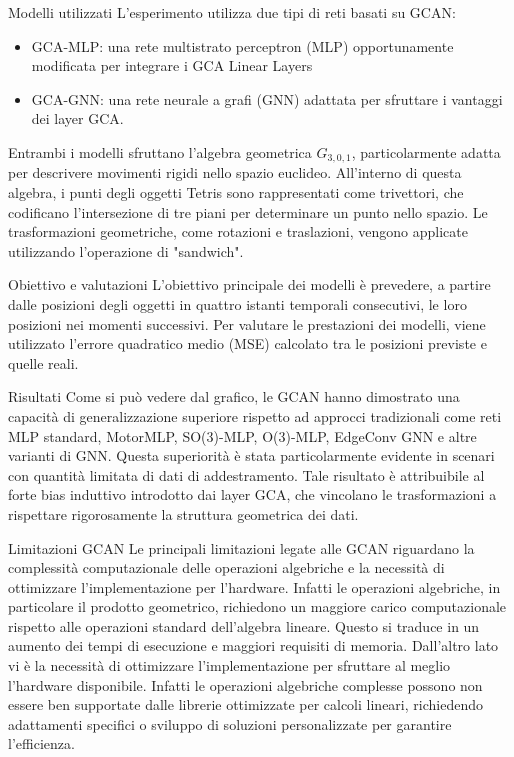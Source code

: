 \begin{frame}{Modelli utilizzati}
   L'esperimento utilizza due tipi di reti basati su GCAN:
   \begin{itemize}
      \item GCA-MLP: una rete multistrato perceptron (MLP) opportunamente modificata per integrare i GCA Linear Layers
      \item GCA-GNN: una rete neurale a grafi (GNN) adattata per sfruttare i vantaggi dei layer GCA.
   \end{itemize}
   Entrambi i modelli sfruttano l’algebra geometrica \(G_{3,0,1}\), particolarmente adatta per descrivere movimenti rigidi nello spazio euclideo. 
   All’interno di questa algebra, i punti degli oggetti Tetris sono rappresentati come trivettori, che codificano l’intersezione di tre piani per determinare un punto nello spazio.
   Le trasformazioni geometriche, come rotazioni e traslazioni, vengono applicate utilizzando l’operazione di "sandwich".
\end{frame}

\begin{frame}{Obiettivo e valutazioni}
   L’obiettivo principale dei modelli è prevedere, a partire dalle posizioni degli oggetti in quattro istanti temporali consecutivi, le loro posizioni nei momenti successivi. 
   Per valutare le prestazioni dei modelli, viene utilizzato l’errore quadratico medio (MSE) calcolato tra le posizioni previste e quelle reali.
\end{frame}

\begin{frame}{Risultati}
   Come si può vedere dal grafico, le GCAN hanno dimostrato una capacità di generalizzazione superiore rispetto ad approcci tradizionali come reti MLP standard, MotorMLP, SO(3)-MLP, O(3)-MLP, EdgeConv GNN e altre varianti di GNN. 
   Questa superiorità è stata particolarmente evidente in scenari con quantità limitata di dati di addestramento. Tale risultato è attribuibile al forte bias induttivo introdotto dai layer GCA, che vincolano le trasformazioni a rispettare rigorosamente la struttura geometrica dei dati.
\end{frame}

\begin{frame}{Limitazioni GCAN}
   Le principali limitazioni legate alle GCAN riguardano la complessità computazionale delle operazioni algebriche e la necessità di ottimizzare l’implementazione per l’hardware. Infatti le operazioni algebriche, in particolare il prodotto geometrico, richiedono un  maggiore carico computazionale rispetto alle operazioni standard dell’algebra lineare. 
   Questo si traduce in un aumento dei tempi di esecuzione e maggiori requisiti di memoria. 
   Dall'altro lato vi è la necessità di ottimizzare l’implementazione per sfruttare al meglio l’hardware disponibile. Infatti le operazioni algebriche complesse possono non essere ben supportate dalle librerie ottimizzate per calcoli lineari, richiedendo adattamenti specifici o sviluppo di soluzioni personalizzate per garantire l'efficienza.
\end{frame}

